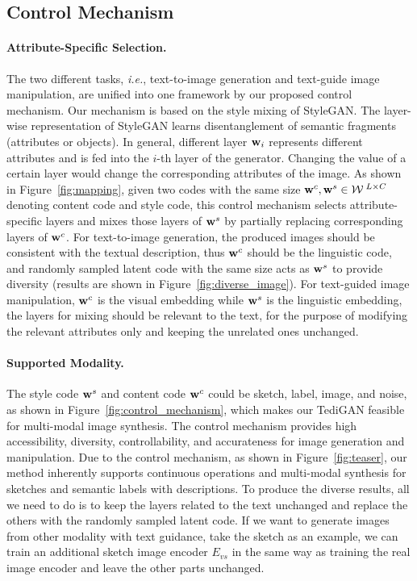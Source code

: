 \documentclass[final]{cvpr}
\newcommand{\w}{{\rm\bf w}}
\newcommand{\W}{\mathcal{W}}
\def\ie{\emph{i.e.}}
\begin{document}
\subsection{Control Mechanism}
\label{subsec:control_mechanism}
\paragraph{Attribute-Specific Selection.} 
The two different tasks, \ie, text-to-image generation and text-guide image manipulation, are unified into one framework by our proposed control mechanism. 
Our mechanism is based on the style mixing of StyleGAN.
The layer-wise representation of StyleGAN learns disentanglement of semantic fragments (attributes or objects).
In general, different layer $\w_i$ represents different attributes and is fed into the $i$-th layer of the generator. 
Changing the value of a certain layer would change the corresponding attributes of the image.
As shown in Figure~\ref{fig:mapping}, given two codes with the same size $\w^c, \w^s \in \W^{\;L \times C}$ denoting content code and style code, this control mechanism selects attribute-specific layers and mixes those layers of $\w^s$ by partially replacing corresponding layers of $\w^c$. 
For text-to-image generation, the produced images should be consistent with the textual description, thus $\w^c$ should be the linguistic code, and randomly sampled latent code with the same size acts as $\w^s$ to provide diversity (results are shown in Figure~\ref{fig:diverse_image}). 
For text-guided image manipulation, $\w^c$ is the visual embedding while $\w^s$ is the linguistic embedding, the layers for mixing should be relevant to the text, for the purpose of modifying the relevant attributes only and keeping the unrelated ones unchanged.

\vspace{-5pt}
\paragraph{Supported Modality.} 
The style code $\w^s$ and content code $\w^c$ could be sketch, label, image, and noise, as shown in Figure~\ref{fig:control_mechanism}, which makes our TediGAN feasible for multi-modal image synthesis.
The control mechanism provides high accessibility, diversity, controllability, and accurateness for image generation and manipulation.
Due to the control mechanism, as shown in Figure~\ref{fig:teaser}, our method inherently supports continuous operations and multi-modal synthesis for sketches and semantic labels with descriptions.
To produce the diverse results, all we need to do is to keep the layers related to the text unchanged and replace the others with the randomly sampled latent code.
If we want to generate images from other modality with text guidance, take the sketch as an example, we can train an additional sketch image encoder $E_{vs}$ in the same way as training the real image encoder and leave the other parts unchanged.
\end{document}
